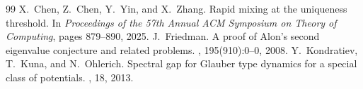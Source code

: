 \documentclass[10pt,a4paper]{amsart}
\begin{document}
\begin{thebibliography}{99}
 X.~Chen, Z.~Chen, Y.~Yin, and X.~Zhang. \newblock Rapid mixing at the uniqueness threshold. \newblock In {\em Proceedings of the 57th Annual ACM Symposium on Theory of Computing}, pages 879--890, 2025.
 J.~Friedman. \newblock A proof of {A}lon’s second eigenvalue conjecture and related problems. , 195(910):0--0, 2008.
 Y.~Kondratiev, T.~Kuna, and N.~Ohlerich. \newblock Spectral gap for {G}lauber type dynamics for a special class of potentials. , 18, 2013.
\end{thebibliography}
\end{document}
